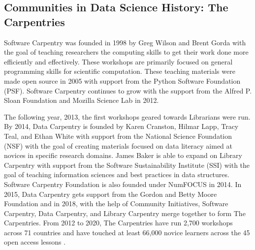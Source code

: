 \documentclass[010-intro.tex]{subfiles}
\begin{document}
    \subsection{Communities in Data Science History: The Carpentries}

        Software Carpentry was founded in 1998 by Greg Wilson and Brent Gorda with the goal of
        teaching researchers the computing skills to get their work done more efficiently and effectively.
        These workshops are primarily focused on general programming skills for scientific computation.
        These teaching materials were made open source in 2005 with support from the Python Software Foundation (PSF).
        Software Carpentry continues to grow with the support from the Alfred P. Sloan Foundation and Mozilla Science Lab in 2012.


        The following year, 2013, the first workshops geared towards Librarians were run.
        By 2014, Data Carpentry is founded by Karen Cranston, Hilmar Lapp, Tracy Teal, and Ethan White
        with support from the National Science Foundation (NSF)
        with the goal of creating materials focused on data literacy aimed at novices in specific research domains.
        James Baker is able to expand on Library Carpentry with support from the Software Sustainability Institute (SSI)
        with the goal of teaching information sciences and best practices in data structures.
        Software Carpentry Foundation is also founded under NumFOCUS in 2014.
        In 2015, Data Carpentry gets support from the Gordon and Betty Moore Foundation and
        in 2018, with the help of Community Initiatives, Software Carpentry, Data Carpentry, and Library Carpentry
        merge together to form The Carpentries.
        From 2012 to 2020, The Carpentries have run
        2,700 workshops across 71 countries and have touched at least 66,000 novice learners
        across the 45 open access lessons
        \cite{CarpentriesHowWe, jordanCarpentries2020Annual}.
\end{document}
